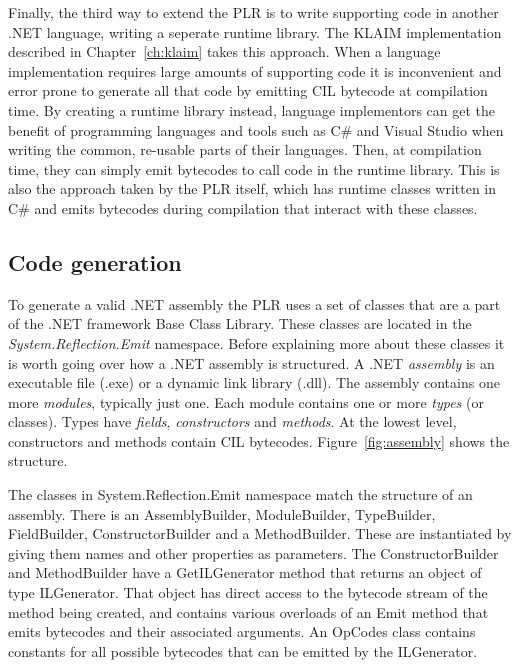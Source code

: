 	Finally, the third way to extend the PLR is to write supporting code in
	another .NET language, writing a seperate runtime library. The KLAIM 
	implementation described in Chapter~\ref{ch:klaim} takes this approach. When 
	a language implementation requires large amounts of supporting code it is 
	inconvenient and error prone to generate all that code by emitting CIL 
	bytecode at compilation time. By creating a runtime library instead, 
	language implementors can get the benefit of programming languages and tools 
	such as C\# and Visual Studio when writing the common, re-usable parts of 
	their languages. Then, at compilation time, they can simply emit bytecodes 
	to call code in the runtime library. This is also the approach taken by the 
	PLR itself, which has runtime classes written in C\# and emits bytecodes 
	during compilation that interact with these classes.	

\subsection{Code generation}
	
	To generate a valid .NET assembly the PLR uses a set of classes that are a 
	part of the .NET framework Base Class Library. These classes are located in 
	the \textit{System.Reflection.Emit} namespace. Before explaining more about 
	these classes it is worth going over how a .NET assembly is structured. A 
	.NET \textit{assembly} is an executable file (.exe) or a dynamic link 
	library (.dll). The assembly contains one more \textit{modules}, typically 
	just one. Each module contains one or more \textit{types} (or classes). 
	Types have \textit{fields}, \textit{constructors} and \textit{methods}. At 
	the lowest level, constructors and methods contain CIL bytecodes. 
	Figure~\ref{fig:assembly} shows the structure.
	
	
	The classes in System.Reflection.Emit namespace match the structure of an 
	assembly. There is an \textsf{AssemblyBuilder}, \textsf{ModuleBuilder}, 
	\textsf{TypeBuilder}, \textsf{FieldBuilder}, \textsf{ConstructorBuilder} and 
	a \textsf{MethodBuilder}. These are instantiated by giving them names and 
	other properties as parameters. The \textsf{ConstructorBuilder} and 
	\textsf{MethodBuilder} have a \textsf{GetILGenerator} method that returns an 
	object of type \textsf{ILGenerator}. That object has direct access to the 
	bytecode stream of the method being created, and contains various overloads 
	of an \textsf{Emit} method that emits bytecodes and their associated 
	arguments. An \textsf{OpCodes} class contains constants for all possible 
	bytecodes that can be emitted by the \textsf{ILGenerator}.
	

